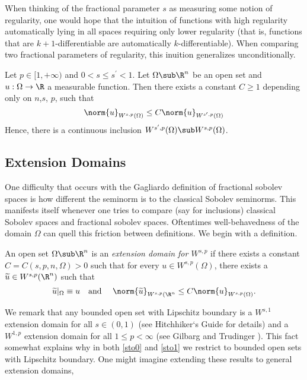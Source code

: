 \documentclass[../main.tex]{subfiles}
\begin{document}
When thinking of the fractional parameter $ s $ as measuring some notion of regularity, one would hope that the intuition of functions with high regularity automatically lying in all spaces requiring only lower regularity (that is, functions that are $ k+1 $-differentiable are automatically $ k $-differentiable). When comparing two fractional parameters of regularity, this inuition generalizes unconditionally.

\begin{proposition}\label{fracisscale}
    Let $ p\in[1,+\infty) $ and $ 0 < s \leq s^{\prime} < 1 $. Let $ \Omega\sub \R^{n} $ be an open set and $ u:\Omega\to \R $ a measurable function. Then there exists a constant $ C \geq 1 $ depending only on $ n$,$s$, $p$, such that
    \[
        \norm{u}_{W^{s,p}(\Omega)} \leq C\norm{u}_{W^{s^{\prime},p}(\Omega)}
    \]
    Hence, there is a continuous inclusion $ W^{s^{\prime},p}(\Omega)\sub W^{s,p}(\Omega)$.
\end{proposition}


\subsection{Extension Domains}

One difficulty that occurs with the Gagliardo definition of fractional sobolev spaces is how different the seminorm is to the classical Sobolev seminorms.
This manifests itself whenever one tries to compare (say for inclusions) classical Sobolev spaces and fractional sobolev spaces. Oftentimes well-behavedness of the domain $ \Omega $ can quell this friction between definitions. We begin with a definition.

\begin{definition}\label{extndomain}
    An open set $ \Omega\sub \R^{n} $ is an \textit{extension domain for $ W^{s,p} $} if  there exists a constant $ C = C(s,p,n,\Omega) > 0 $ such that for every $ u\in W^{s,p}(\Omega) $, there exists a $ \widetilde{u}\in W^{s,p}(\R^{n}) $ such that 
    \[
        \widetilde{u}\vert_{\Omega} \equiv u \quad\text{and }\quad \norm{\widetilde{u}}_{W^{s,p}(\R^{n}}\leq C \norm{u}_{W^{s,p}(\Omega)}.
    \]
\end{definition}

We remark that any bounded open set with Lipschitz boundary is a $ W^{s,1} $ extension domain for all $ s\in (0,1) $ (see Hitchhiker`s Guide \cite{hitchhiker} for details) and a $ W^{1,p} $ extension domain for all $ 1\leq p <\infty $ (see Gilbarg and Trudinger \cite[Thm.~7.25]{gilbarg}). This fact somewhat explains why in both \ref{sto0} and \ref{sto1} we restrict to bounded open sets with Lipschitz boundary. One might imagine extending these results to general extension domains,
\end{document}
